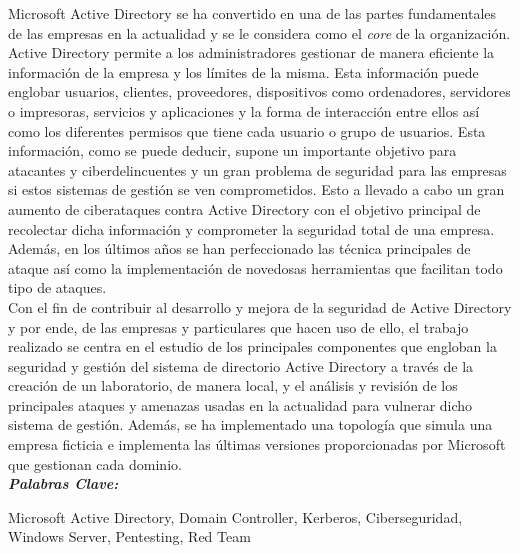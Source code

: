 
\setcounter{page}{5}
	
Microsoft Active Directory se ha convertido en una de las partes fundamentales de las empresas en la actualidad y se le considera como el {\it core} de la organización. Active Directory permite a los administradores gestionar de manera eficiente la información de la empresa y los límites de la misma. Esta información puede englobar usuarios, clientes, proveedores, dispositivos como ordenadores, servidores o impresoras, servicios y aplicaciones y la forma de interacción entre ellos así como los diferentes permisos que tiene cada usuario o grupo de usuarios. Esta información, como se puede deducir, supone un importante objetivo para atacantes y ciberdelincuentes y un gran problema de seguridad para las empresas si estos sistemas de gestión se ven comprometidos. Esto a llevado a cabo un gran aumento de ciberataques contra Active Directory con el objetivo principal de recolectar dicha información y comprometer la seguridad total de una empresa. Además, en los últimos años se han perfeccionado las técnica principales de ataque así como la implementación de novedosas herramientas que facilitan todo tipo de ataques.\\ 

Con el fin de contribuir al desarrollo y mejora de la seguridad de Active Directory y por ende, de las empresas y particulares que hacen uso de ello, el trabajo realizado se centra en el estudio de los principales componentes que engloban la seguridad y gestión del sistema de directorio Active Directory a través de la creación de un laboratorio, de manera local, y el análisis y revisión de los principales ataques y amenazas usadas en la actualidad para vulnerar dicho sistema de gestión. Además, se ha implementado una topología que simula una empresa ficticia e implementa las últimas versiones proporcionadas por Microsoft que gestionan cada dominio. \\

\textit{\textbf{Palabras Clave:}}

Microsoft Active Directory, Domain Controller, Kerberos, Ciberseguridad, Windows Server, Pentesting, Red Team
	
		
\vfill
\newpage %
\thispagestyle{empty}
\mbox{}
